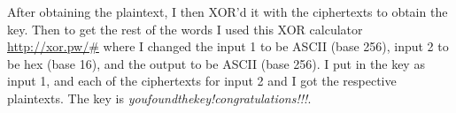 \documentclass[11pt]{article}
\begin{document}
	After obtaining the plaintext, I then XOR'd it with the ciphertexts to obtain the key. Then to get the rest of the words I used this XOR calculator \href{http://xor.pw/#}{http://xor.pw/\#} where I changed the input 1 to be ASCII (base 256), input 2 to be hex (base 16), and the output to be ASCII (base 256). I put in the key as input 1, and each of the ciphertexts for input 2 and I got the respective plaintexts. The key is \textit{youfoundthekey!congratulations!!!}. 
\end{document}
